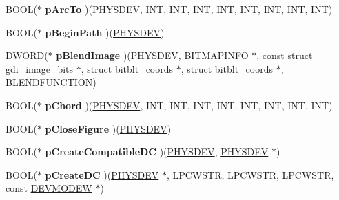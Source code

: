 \begin{DoxyCompactItemize}
B\+O\+OL($\ast$ {\bfseries p\+Arc\+To} )(\hyperlink{structgdi__physdev}{P\+H\+Y\+S\+D\+EV}, I\+NT, I\+NT, I\+NT, I\+NT, I\+NT, I\+NT, I\+NT, I\+NT)
\item 
\mbox{\label{structgdi__dc__funcs_acdddc6c3472cc7a04bcd9eb5f9544de1}} 
B\+O\+OL($\ast$ {\bfseries p\+Begin\+Path} )(\hyperlink{structgdi__physdev}{P\+H\+Y\+S\+D\+EV})
\item 
\mbox{\label{structgdi__dc__funcs_a1fe3c0d88a803673000653658c5c0e17}} 
D\+W\+O\+RD($\ast$ {\bfseries p\+Blend\+Image} )(\hyperlink{structgdi__physdev}{P\+H\+Y\+S\+D\+EV}, \hyperlink{structtag_b_i_t_m_a_p_i_n_f_o}{B\+I\+T\+M\+A\+P\+I\+N\+FO} $\ast$, const \hyperlink{interfacestruct}{struct} \hyperlink{structgdi__image__bits}{gdi\+\_\+image\+\_\+bits} $\ast$, \hyperlink{interfacestruct}{struct} \hyperlink{structbitblt__coords}{bitblt\+\_\+coords} $\ast$, \hyperlink{interfacestruct}{struct} \hyperlink{structbitblt__coords}{bitblt\+\_\+coords} $\ast$, \hyperlink{struct___b_l_e_n_d_f_u_n_c_t_i_o_n}{B\+L\+E\+N\+D\+F\+U\+N\+C\+T\+I\+ON})
\item 
\mbox{\label{structgdi__dc__funcs_a2daec82fbfcb02317ebb75e2cade2677}} 
B\+O\+OL($\ast$ {\bfseries p\+Chord} )(\hyperlink{structgdi__physdev}{P\+H\+Y\+S\+D\+EV}, I\+NT, I\+NT, I\+NT, I\+NT, I\+NT, I\+NT, I\+NT, I\+NT)
\item 
\mbox{\label{structgdi__dc__funcs_af0c5458423d81996182ae7dc2c1ac0b7}} 
B\+O\+OL($\ast$ {\bfseries p\+Close\+Figure} )(\hyperlink{structgdi__physdev}{P\+H\+Y\+S\+D\+EV})
\item 
\mbox{\label{structgdi__dc__funcs_af7cd7149215fa200ed9682d95d806cdc}} 
B\+O\+OL($\ast$ {\bfseries p\+Create\+Compatible\+DC} )(\hyperlink{structgdi__physdev}{P\+H\+Y\+S\+D\+EV}, \hyperlink{structgdi__physdev}{P\+H\+Y\+S\+D\+EV} $\ast$)
\item 
\mbox{\label{structgdi__dc__funcs_afea0962317551b9824019c038a834abd}} 
B\+O\+OL($\ast$ {\bfseries p\+Create\+DC} )(\hyperlink{structgdi__physdev}{P\+H\+Y\+S\+D\+EV} $\ast$, L\+P\+C\+W\+S\+TR, L\+P\+C\+W\+S\+TR, L\+P\+C\+W\+S\+TR, const \hyperlink{struct__devicemode_w}{D\+E\+V\+M\+O\+D\+EW} $\ast$)
\item 

\end{DoxyCompactItemize}
